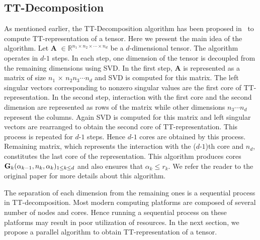 \documentclass[runningheads]{llncs}
\newcommand{\tensor}[1]{{\cal\textbf{#1}\xspace}}
\begin{document}
\subsection{TT-Decomposition}
As mentioned earlier, the TT-Decomposition algorithm has been proposed in~\cite{tt} to compute TT-representation of a tensor. Here we present the main idea of the algorithm. Let \tensor{A} $\in \mathbb{R}^{n_1 \times n_2 \times \cdots \times n_d}$ be a $d$-dimensional tensor. The algorithm operates in $d$-$1$ steps. In each step, one dimension of the tensor is decoupled from the remaining dimensions using SVD. In the first step, \tensor{A} is represented as a matrix of size $n_1$ $\times$ $n_2 n_3 \cdots n_d$ and SVD is computed for this matrix. The left singular vectors corresponding to nonzero singular values are the first core of TT-representation. In the second step, interaction with the first core and the second dimension are represented as rows of the matrix while other dimensions $n_3\cdots n_d$ represent the columns. Again SVD is computed for this matrix and left singular vectors are rearranged to obtain the second core of TT-representation. This process is repeated for $d$-$1$ steps. Hence $d$-$1$ cores are obtained by this process. Remaining matrix, which represents the interaction with the ($d$-$1$)th core and $n_d$, constitutes the last core of the representation. This algorithm produces cores $\tensor{G}_k(\alpha_{k-1}, n_k, \alpha_k) _{1\le k\le d}$ and also ensures that $\alpha_k \le r_k$. We refer the reader to the original paper for more details about this algorithm. 


The separation of each dimension from the remaining ones is a sequential process in TT-decomposition. Most modern computing platforms are composed of several number of nodes and cores. Hence running a sequential process on these platforms may result in poor utilization of resources. In the next section, we propose a parallel algorithm to obtain TT-representation of a tensor.
\end{document}
